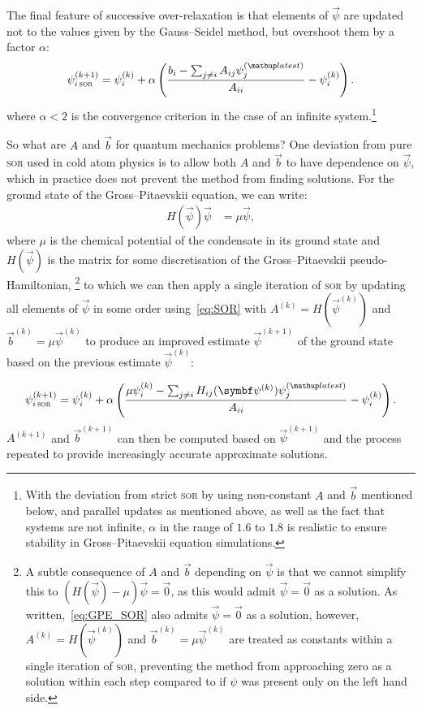 The final feature of successive over-relaxation is that elements of $\vec\psi$ are updated not to the values given by the Gauss--Seidel method, but overshoot them by a factor $\alpha$:
\begin{align}\label{eq:SOR}
\psi^{(k+1)}_{i\,\textsc{sor}} = \psi^{(k)}_i + \alpha\left(\frac{b_i - \sum_{j\neq i} A_{ij}\psi^{(\up{latest})}_j}{A_{ii}} - \psi^{(k)}_i\right).
\end{align}
where $\alpha < 2$ is the convergence criterion in the case of an infinite system.\footnote{With the deviation from strict \textsc{sor} by using non-constant $A$ and $\vec b$ mentioned below, and parallel updates as mentioned above, as well as the fact that systems are not infinite, $\alpha$ in the range of $1.6$ to $1.8$ is realistic to ensure stability in Gross--Pitaevskii equation simulations.}

So what are $A$ and $\vec b$ for quantum mechanics problems? One deviation from pure \textsc{sor} used in cold atom physics is to allow both $A$ and $\vec b$ to have dependence on $\vec\psi$, which in practice does not prevent the method from finding solutions. For the ground state of the Gross--Pitaevskii equation, we can write:
\begin{align}\label{eq:GPE_SOR}
H(\vec\psi)\vec \psi &= \mu\vec \psi,
\end{align}
where $\mu$ is the chemical potential of the condensate in its ground state and $H(\vec\psi)$ is the matrix for some discretisation of the Gross--Pitaevskii pseudo-Hamiltonian,
\footnote{A subtle consequence of $A$ and $\vec b$ depending on $\vec\psi$ is that we cannot simplify this to $(H(\vec\psi) - \mu)\vec \psi = \vec0$, as this would admit $\vec\psi=\vec0$ as a solution. As written,~\eqref{eq:GPE_SOR} also admits $\vec\psi=\vec0$ as a solution, however, $A^{(k)} = H(\vec\psi^{(k)})$ and $\vec b^{(k)} = \mu\vec\psi^{(k)}$ are treated as constants within a single iteration of \textsc{sor}, preventing the method from approaching zero as a solution within each step compared to if $\psi$ was present only on the left hand side.}
 to which we can then apply a single iteration of \textsc{sor} by updating all elements of $\vec\psi$ in some order using~\eqref{eq:SOR} with $A^{(k)} = H(\vec\psi^{(k)})$ and $\vec b^{(k)} = \mu\vec\psi^{(k)}$ to produce an improved estimate $\vec\psi^{(k+1)}$ of the ground state based on the previous estimate $\vec\psi^{(k)}$:

\begin{align}\label{eq:SOR_GPE}
\psi^{(k+1)}_{i\,\textsc{sor}} = \psi^{(k)}_i + \alpha\left(\frac{\mu\psi^{(k)}_i - \sum_{j\neq i} H_{ij}(\vec\psi^{(k)})\psi^{(\up{latest})}_j}{A_{ii}} - \psi^{(k)}_i\right).
\end{align}
$A^{(k+1)}$ and $\vec b^{(k+1)}$ can then be computed based on $\vec\psi^{(k+1)}$ and the process repeated to provide increasingly accurate approximate solutions.

